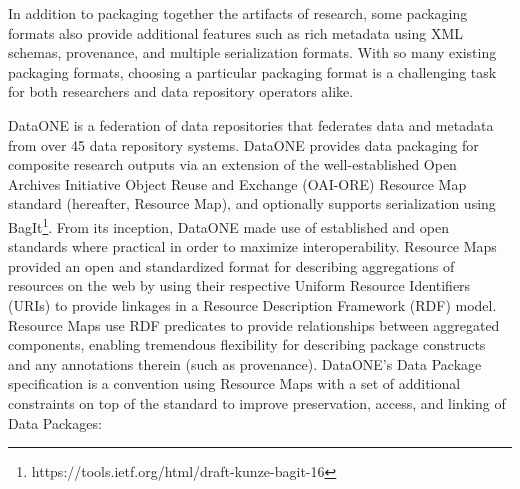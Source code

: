 \documentclass[conference]{IEEEtran}
\begin{document}
In addition to packaging together the artifacts of research, some packaging formats also provide additional features such as rich metadata using XML schemas, provenance, and multiple serialization formats.
With so many existing packaging formats, choosing a particular packaging format is a challenging task for both researchers and data repository operators alike.

DataONE is a federation of data repositories that federates data and metadata from over 45 data repository systems.
DataONE provides data packaging for composite research outputs via an extension of the well-established Open Archives Initiative Object Reuse and Exchange (OAI-ORE) \cite{lagoze2012} Resource Map standard (hereafter, Resource Map), and optionally supports serialization using BagIt\footnote{https://tools.ietf.org/html/draft-kunze-bagit-16}. 
From its inception, DataONE made use of established and open standards where practical in order to maximize interoperability.
Resource Maps provided an open and standardized format for describing aggregations of resources on the web by using their respective Uniform Resource Identifiers (URIs) to provide linkages in a Resource Description Framework (RDF) model. Resource Maps use RDF predicates to provide relationships between aggregated components, enabling tremendous flexibility for describing package constructs and any annotations therein (such as provenance). DataONE’s Data Package specification is a convention using Resource Maps with a set of additional constraints on top of the standard to improve preservation, access, and linking of Data Packages:
\end{document}
